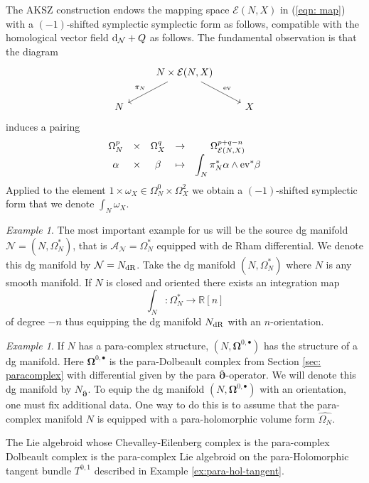 \documentclass[letterpaper,12pt]{article}
\newcommand{\RR}{\mathbb{R}}
\newcommand{\cE}{\mathcal{E}}
\newcommand{\cN}{\mathcal{N}}
\newcommand{\sA}{\mathcal{A}}
\def\d{{\rm d}}
\newcommand{\p}{\partial}
\newcommand{\pd}{\overline{\bm{\p}}}
\theoremstyle{definition}
\theoremstyle{remark}
\theoremstyle{examples}
\newtheorem{Ex}[theorem]{Example}
\begin{document}
The AKSZ construction endows the mapping space $\cE(N, X)$ in (\ref{eqn: map}) with a $(-1)$-shifted symplectic symplectic form as follows, compatible with the homological vector field $\d_{\cN} + Q$ as follows.
The fundamental observation is that the diagram
\begin{equation*}
	\begin{tikzcd}
	& N \times \cE(N, X)\arrow{rd}{{\rm ev}}\arrow[swap]{ld}{\pi_N} &\\
	N & & X
	\end{tikzcd}
\end{equation*}
induces a pairing
\[
\begin{array}{ccccc}
 \Omega^p_N& \times & \Omega^q_X & \to & \Omega^{p+q-n}_{\cE(N, X)} \\
\displaystyle \alpha & \times & \beta & \mapsto & \displaystyle \int_N \pi_N^* \alpha \wedge {\rm ev}^* \beta 
 \end{array}
 \]
Applied to the element $1 \times \omega_X \in \Omega^0_N \times \Omega^{2}_X$ we obtain a $(-1)$-shifted symplectic form that we denote $\int_N \omega_X$.

\begin{Ex}
The most important example for us will be the source dg manifold $\cN = (N, \Omega^*_N)$, that is $\sA_\cN = \Omega^*_N$ equipped with de Rham differential. 
We denote this dg manifold by $\cN = N_{\rm dR}$.
Take the dg manifold $(N, \Omega^*_N)$ where $N$ is any smooth manifold. 
If $N$ is closed and oriented there exists an integration map
\[
\int_N : \Omega^*_N \to \RR[n]
\]
of degree $-n$ thus equipping the dg manifold $N_{\rm dR}$ with an $n$-orientation. 
\end{Ex}

\begin{Ex}
If $N$ has a para-complex structure, $(N, \mathbf{\Omega}^{0,\bullet})$ has the structure of a dg manifold. 
Here $\mathbf{\Omega}^{0,\bullet}$ is the para-Dolbeault complex from Section \ref{sec: paracomplex} with differential given by the para $\pd$-operator. 
We will denote this dg manifold by $N_{\pd}$. 
To equip the dg manifold $(N, \mathbf{\Omega}^{0,\bullet})$ with an orientation, one must fix additional data. 
One way to do this is to assume that the para-complex manifold $N$ is equipped with a para-holomorphic volume form $\hat{\Omega_N}$.

The Lie algebroid whose Chevalley-Eilenberg complex is the para-complex Dolbeault complex is the para-complex Lie algebroid on the para-Holomorphic tangent bundle $T^{0,1}$ described in Example \ref{ex:para-hol-tangent}.
\end{Ex}
\end{document}
